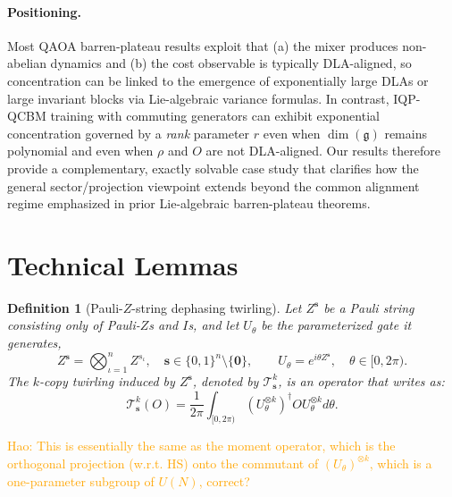 \documentclass[a4paper,onecolumn,notitlepage,nofootinbib,longbibliography,superscriptaddress, floatfix, pra, aps, 10pt]{revtex4-2}
\newcommand{\vts}{{\bm{s}}}
\newtheorem{definition}{Definition}
\newcommand\hw[1]{\textcolor{orange}{Hao: #1}}
\begin{document}
\paragraph{Positioning.}
Most QAOA barren-plateau results exploit that (a) the mixer produces non-abelian dynamics and (b) the cost observable is typically DLA-aligned, so concentration can be linked to the emergence of exponentially large DLAs or large invariant blocks via Lie-algebraic variance formulas.
In contrast, IQP-QCBM training with commuting generators can exhibit exponential concentration governed by a \emph{rank} parameter $r$ even when $\dim(\mathfrak g)$ remains polynomial and even when $\rho$ and $O$ are not DLA-aligned.
Our results therefore provide a complementary, exactly solvable case study that clarifies how the general sector/projection viewpoint extends beyond the common alignment regime emphasized in prior Lie-algebraic barren-plateau theorems.



\appendix

\section{Technical Lemmas}
\begin{definition}[Pauli-$Z$-string dephasing twirling] 
Let $Z^\vts$ be a Pauli string consisting only of Pauli-$Z$s and $I$s, and let $U_\theta$ be the parameterized gate it generates,
\begin{equation}
Z^{\vts} = \bigotimes_{\iota=1}^n Z^{s_\iota}, \quad \vts \in \{0,1\}^n \setminus \{\mathbf{0}\}, \qquad U_{\theta} = e^{i\theta Z^{\vts}}, \quad \theta\in[0, 2\pi).
\end{equation}
The $k$-copy twirling induced by $Z^\vts$, denoted by $\mathcal{T}^k_\vts$, is an operator that writes as:
\begin{equation}
\mathcal{T}^k_\vts (O) =  \frac{1}{2\pi}\int_{[0,2\pi)} \left(U_{\theta}^{\otimes k}\right)^\dagger O U_{\theta} ^{\otimes k}  d \theta.
\end{equation}
\end{definition}
\hw{This is essentially the same as the moment operator, which is the orthogonal projection (w.r.t. HS) onto the commutant of $(U_\theta)^{\otimes k}$, which is a one-parameter subgroup of $U(N)$, correct?}
\end{document}

